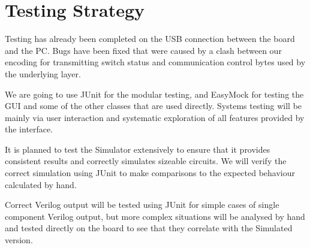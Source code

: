 \documentclass[12pt, a4paper, oneside,titlepage]{article}
\begin{document}
\section{Testing Strategy}
Testing has already been completed on the USB connection between the board and the PC. Bugs have been fixed that were caused by a clash between our encoding for transmitting switch status and communication control bytes used by the underlying layer. 

We are going to use JUnit for the modular testing, and EasyMock for testing the GUI and some of the other classes that are used directly. Systems testing will be mainly via user interaction and systematic exploration of all features provided by the interface. 

It is planned to test the Simulator extensively to ensure that it provides consistent results and correctly simulates sizeable circuits. We will verify the correct simulation using JUnit to make comparisons to the expected behaviour calculated by hand. 

Correct Verilog output will be tested using JUnit for simple cases of single component Verilog output, but more complex situations will be analysed by hand and tested directly on the board to see that they correlate with the Simulated version.
\end{document}
